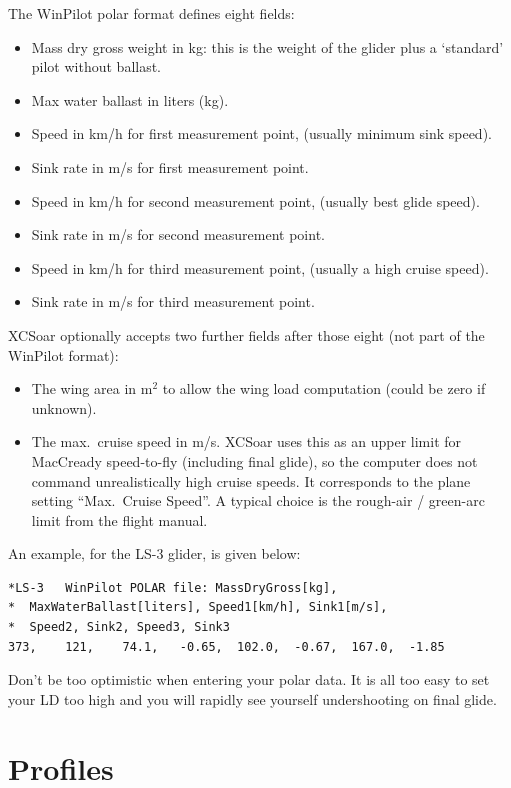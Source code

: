 The WinPilot polar format defines eight fields:
\begin{itemize}
\item Mass dry gross weight in kg: this is the weight of the glider plus
  a `standard' pilot without ballast.
\item Max water ballast in liters (kg).
\item Speed in km/h for first measurement point, (usually minimum sink speed).
\item Sink rate in m/s for first measurement point.
\item Speed in km/h for second measurement point, (usually best glide speed).
\item Sink rate in m/s for second measurement point.
\item Speed in km/h for third measurement point, (usually a high cruise speed).
\item Sink rate in m/s for third measurement point.
\end{itemize}
XCSoar optionally accepts two further fields after those eight (not part of
the WinPilot format):
\begin{itemize}
\item The wing area in m$^2$ to allow the wing load computation (could be zero if unknown).
\item The max.\ cruise speed in m/s.  XCSoar uses this as an upper limit
  for MacCready speed-to-fly (including final glide), so the computer does
  not command unrealistically high cruise speeds.  It corresponds to the
  plane setting ``Max.\ Cruise Speed''.  A typical choice is the rough-air
  / green-arc limit from the flight manual.
\end{itemize}

An example, for the LS-3 glider, is given below:
\begin{verbatim}
*LS-3	WinPilot POLAR file: MassDryGross[kg], 
*  MaxWaterBallast[liters], Speed1[km/h], Sink1[m/s], 
*  Speed2, Sink2, Speed3, Sink3  	
373,	121,	74.1,	-0.65,	102.0,	-0.67,	167.0,	-1.85
\end{verbatim}

\tip Don't be too optimistic when entering your polar data. It is all too
easy to set your LD too high and you will rapidly see yourself
undershooting on final glide.

\section{Profiles}

